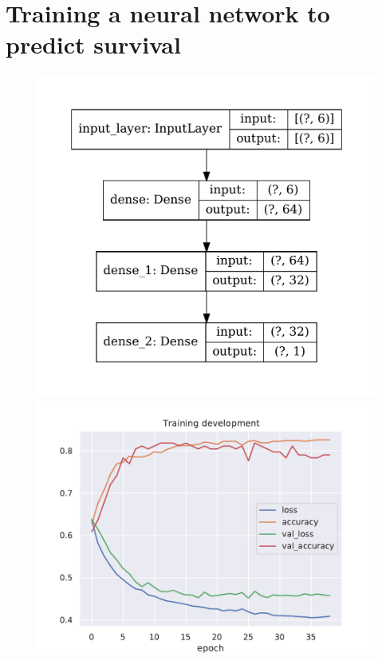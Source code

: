 \documentclass{book}
\begin{document}
\section*{Training a neural network to predict survival}
\begin{figure}[h]
    \centering
    \includegraphics[scale=.4]{../figs/model.pdf}
    \includegraphics[scale=.65]{../figs/training_development.pdf}
\end{figure}

\clearpage
\end{document}
